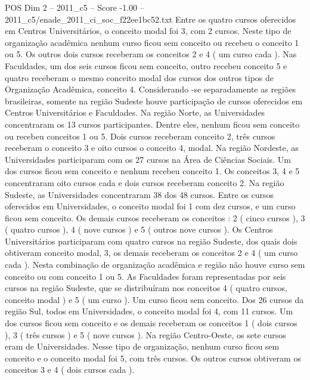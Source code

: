 \begin{textsample}{POS Dim 2 – 2011\_c5 – Score -1.00 – 2011\_c5/enade\_2011\_ci\_soc\_f22ee1bc52.txt}
Entre os quatro cursos oferecidos em Centros Universitários, o conceito modal foi 3, com 2 cursos.
Neste tipo de organização acadêmica nenhum curso ficou sem conceito ou recebeu o conceito 1 ou 5.
Os outros dois cursos receberam os conceitos 2 e 4 ( um curso cada ).
Nas Faculdades, um dos seis cursos ficou sem conceito, outro recebeu conceito 5 e quatro receberam o mesmo conceito modal dos cursos dos outros tipos de Organização Acadêmica, conceito 4.
Considerando -se separadamente as regiões brasileiras, somente na região Sudeste houve participação de cursos oferecidos em Centros Universitários e Faculdades.
Na região Norte, as Universidades concentraram os 13 cursos participantes.
Dentre eles, nenhum ficou sem conceito ou recebeu conceitos 1 ou 5.
Dois cursos receberam conceito 2, três cursos receberam o conceito 3 e oito cursos o conceito 4, modal.
Na região Nordeste, as Universidades participaram com os 27 cursos na Área de Ciências Sociais.
Um dos cursos ficou sem conceito e nenhum recebeu conceito 1.
Os conceitos 3, 4 e 5 concentraram oito cursos cada e dois cursos receberam conceito 2.
Na região Sudeste, as Universidades concentraram 38 dos 48 cursos.
Entre os cursos oferecidos em Universidades, o conceito modal foi 1 com dez cursos, e um curso ficou sem conceito.
Os demais cursos receberam os conceitos : 2 ( cinco cursos ), 3 ( quatro cursos ), 4 ( nove cursos ) e 5 ( outros nove cursos ).
Os Centros Universitários participaram com quatro cursos na região Sudeste, dos quais dois obtiveram conceito modal, 3, os demais receberam os conceitos 2 e 4 ( um curso cada ).
Nesta combinação de organização acadêmica e região não houve curso sem conceito ou com conceito 1 ou 5.
As Faculdades foram representadas por seis cursos na região Sudeste, que se distribuíram nos conceitos 4 ( quatro cursos, conceito modal ) e 5 ( um curso ).
Um curso ficou sem conceito.
Dos 26 cursos da região Sul, todos em Universidades, o conceito modal foi 4, com 11 cursos.
Um dos cursos ficou sem conceito e os demais receberam os conceitos 1 ( dois cursos ), 3 ( três cursos ) e 5 ( nove cursos ).
Na região Centro-Oeste, os sete cursos eram de Universidades.
Nesse tipo de organização, nenhum curso ficou sem conceito e o conceito modal foi 5, com três cursos.
Os outros cursos obtiveram os conceitos 3 e 4 ( dois cursos cada ).

\end{textsample}
